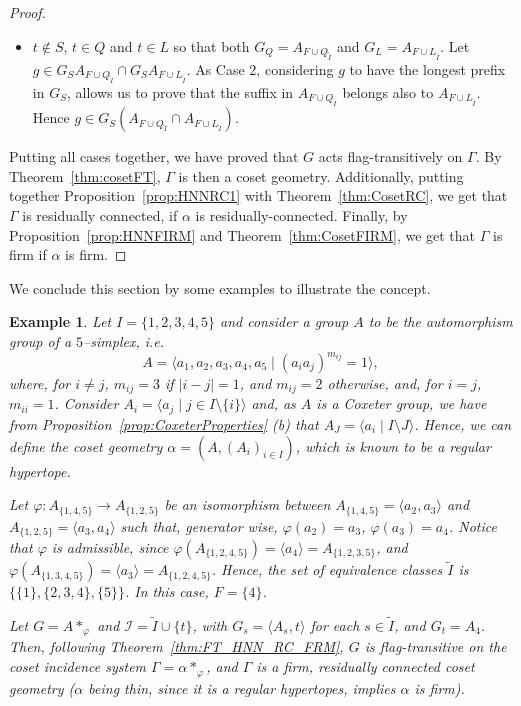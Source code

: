 \documentclass[11pt,letterpaper]{amsart}
\newtheorem{example}[prop]{Example}
\newcommand{\II}{\mathcal{I}}
\begin{document}
\begin{proof}
\begin{itemize}
        \item[Case 4:] $t\notin S$, $t\in Q$ and $t\in L$ so that both  $G_Q=A_{F\cup Q_{\widetilde{I}}}$ and $G_L=A_{F\cup L_{\widetilde{I}}}$. Let $g\in G_SA_{F\cup Q_{\widetilde{I}}}\cap G_S A_{F\cup L_{\widetilde{I}}}$. As Case $2$, considering $g$ to have the longest prefix in $G_S$, allows us to prove that the suffix in $A_{F\cup Q_{\widetilde{I}}}$ belongs also to $A_{F\cup L_{\widetilde{I}}}$. Hence $g\in G_S(A_{F\cup Q_{\widetilde{I}}}\cap A_{F\cup L_{\widetilde{I}}})$.


    \end{itemize}
Putting all cases together, we have proved that $G$ acts flag-transitively on $\Gamma$. By Theorem~\ref{thm:cosetFT}, $\Gamma$ is then a coset geometry.
Additionally,  putting together Proposition~\ref{prop:HNNRC1} with Theorem~\ref{thm:CosetRC}, we get that $\Gamma$ is residually connected, if $\alpha$ is residually-connected.
Finally, by Proposition~\ref{prop:HNNFIRM} and Theorem~\ref{thm:CosetFIRM}, we get that $\Gamma$ is firm if $\alpha$ is firm.   
 \end{proof}

We conclude this section by some examples to illustrate the concept.


\begin{example}\label{example:HNN}
    Let $I=\{1,2,3,4,5\}$ and consider a group $A$ to be the automorphism group of a $5$--simplex, i.e. $$A=\langle a_1,a_2,a_3,a_4,a_5\mid (a_ia_j)^{m_{ij}}= 1\rangle,$$
    where, for $i\neq j$, $m_{ij}=3$ if $|i-j|=1$, and $m_{ij}=2$ otherwise, and, for $i=j$, $m_{ii}=1$.
    Consider $A_i = \langle a_j \mid j\in I\setminus\{i\}\rangle$ and, as $A$ is a Coxeter group, we have from Proposition~\ref{prop:CoxeterProperties} (b) that $A_J = \langle a_i\mid I\setminus J\rangle$. Hence, we can define the coset geometry $\alpha=(A,(A_i)_{i\in I})$, which is known to be a regular hypertope.
    
    Let $\varphi: A_{\{1,4,5\}}\to A_{\{1,2,5\}}$ be an isomorphism between $A_{\{1,4,5\}}=\langle a_2, a_3\rangle$ and $A_{\{1,2,5\}}=\langle a_3,a_4\rangle$ such that, generator wise, $\varphi(a_2)=a_3$, $\varphi(a_3)=a_4$. Notice that $\varphi$ is admissible, since $\varphi(A_{\{1,2,4,5\}})=\langle a_4\rangle = A_{\{1,2,3,5\}}$, and $\varphi(A_{\{1,3,4,5\}})=\langle a_3\rangle = A_{\{1,2,4,5\}}$.
    Hence, the set of equivalence classes $\widetilde{I}$ is $\{\{1\},\{2,3,4\},\{5\}\}$. In this case, $F = \{4\}$.

    Let $G=A*_\varphi$ and $\II=\widetilde{I}\cup\{t\}$, with $G_s=\langle A_s, t\rangle$ for each $s\in \widetilde{I}$, and $G_t = A_4$.
    Then, following Theorem~\ref{thm:FT_HNN_RC_FRM}, $G$ is flag-transitive on the coset incidence system $\Gamma=\alpha*_\varphi$, and $\Gamma$ is a firm, residually connected coset geometry ($\alpha$ being thin, since it is a regular hypertopes, implies $\alpha$ is firm).
    
\end{example}
\end{document}
